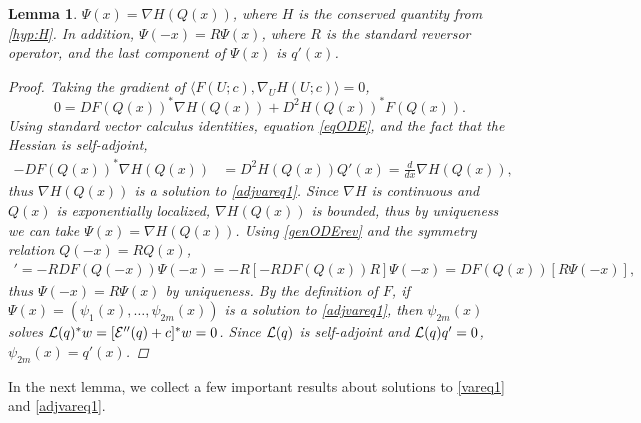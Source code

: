 \documentclass[12pt]{elsarticle}
\theoremstyle{plain}
\newtheorem{lemma}[theorem]{Lemma}
\theoremstyle{definition}
\theoremstyle{remark}
\numberwithin{theorem}{section}
\numberwithin{equation}{section}
\begin{document}
\begin{lemma}\label{psiform}
$\Psi(x) = \nabla H(Q(x))$, where $H$ is the conserved quantity from \cref{hyp:H}. In addition, $\Psi(-x) = R \Psi(x)$, where $R$ is the standard reversor operator, and the last component of $\Psi(x)$ is $q'(x)$.
\begin{proof}
Taking the gradient of $\langle F(U; c), \nabla_U H(U; c) \rangle = 0$, 
\[
0 = D F(Q(x))^* \nabla H(Q(x)) + D^2 H(Q(x))^* F(Q(x)).
\]
Using standard vector calculus identities, equation \cref{eqODE}, and the fact that the Hessian is self-adjoint,
\begin{align*}
-D F(Q(x))^* \nabla H(Q(x)) &= D^2 H(Q(x)) Q'(x) = \frac{d}{dx} \nabla H(Q(x)),
\end{align*}
thus $\nabla H(Q(x))$ is a solution to \cref{adjvareq1}. Since $\nabla H$ is continuous and $Q(x)$ is exponentially localized, $\nabla H(Q(x))$ is bounded, thus by uniqueness we can take $\Psi(x) = \nabla H(Q(x))$. Using \cref{genODErev} and the symmetry relation $Q(-x) = R Q(x)$, 
\begin{align*}
[R \Psi(-x)]' = -R DF(Q(-x)) \Psi(-x) 
= -R [-RDF(Q(x))R] \Psi(-x) = DF(Q(x))[ R \Psi(-x) ],
\end{align*}
thus $\Psi(-x) = R \Psi(x)$ by uniqueness. By the definition of $F$, if $\Psi(x) = (\psi_1(x), \dots, \psi_{2m}(x))$ is a solution to \cref{adjvareq1}, then $\psi_{2m}(x)$ solves $\mathcal{L}(q)^* w = [\mathcal{E}''(q) + c]^* w = 0$. Since $\mathcal{L}(q)$ is self-adjoint and $\mathcal{L}(q)q' = 0$, $\psi_{2m}(x) = q'(x)$.
\end{proof}
\end{lemma}

In the next lemma, we collect a few important results about solutions to \cref{vareq1} and \cref{adjvareq1}.
\end{document}
